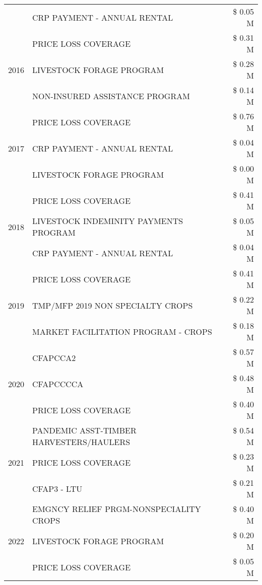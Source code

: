 \begin{tabular}{llr}
 & CRP PAYMENT - ANNUAL RENTAL & \$ 0.05 M \\
\cline{1-3}
\multirow[t]{3}{*}{2016} & PRICE LOSS COVERAGE & \$ 0.31 M \\
 & LIVESTOCK FORAGE PROGRAM & \$ 0.28 M \\
 & NON-INSURED ASSISTANCE PROGRAM & \$ 0.14 M \\
\cline{1-3}
\multirow[t]{3}{*}{2017} & PRICE LOSS COVERAGE & \$ 0.76 M \\
 & CRP PAYMENT - ANNUAL RENTAL & \$ 0.04 M \\
 & LIVESTOCK FORAGE PROGRAM & \$ 0.00 M \\
\cline{1-3}
\multirow[t]{3}{*}{2018} & PRICE LOSS COVERAGE & \$ 0.41 M \\
 & LIVESTOCK INDEMINITY PAYMENTS PROGRAM & \$ 0.05 M \\
 & CRP PAYMENT - ANNUAL RENTAL & \$ 0.04 M \\
\cline{1-3}
\multirow[t]{3}{*}{2019} & PRICE LOSS COVERAGE & \$ 0.41 M \\
 & TMP/MFP 2019 NON SPECIALTY CROPS & \$ 0.22 M \\
 & MARKET FACILITATION PROGRAM - CROPS & \$ 0.18 M \\
\cline{1-3}
\multirow[t]{3}{*}{2020} & CFAPCCA2 & \$ 0.57 M \\
 & CFAPCCCCA & \$ 0.48 M \\
 & PRICE LOSS COVERAGE & \$ 0.40 M \\
\cline{1-3}
\multirow[t]{3}{*}{2021} & PANDEMIC ASST-TIMBER HARVESTERS/HAULERS & \$ 0.54 M \\
 & PRICE LOSS COVERAGE & \$ 0.23 M \\
 & CFAP3 - LTU & \$ 0.21 M \\
\cline{1-3}
\multirow[t]{3}{*}{2022} & EMGNCY RELIEF PRGM-NONSPECIALITY CROPS & \$ 0.40 M \\
 & LIVESTOCK FORAGE PROGRAM & \$ 0.20 M \\
 & PRICE LOSS COVERAGE & \$ 0.05 M \\
\cline{1-3}
\bottomrule
\end{tabular}
